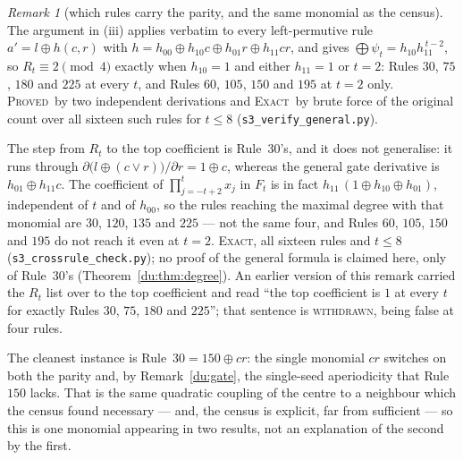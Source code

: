 \documentclass[11pt]{article}
\theoremstyle{definition}
\theoremstyle{remark}
\newtheorem{remark}[theorem]{Remark}
\newcommand{\PROVED}{\textsc{Proved}}
\newcommand{\EXACT}{\textsc{Exact}}
\begin{document}
\begin{remark}[which rules carry the parity, and the same monomial as the census]\label{du:degreerules}
The argument in (iii) applies verbatim to every left-permutive rule $a'=l\oplus h(c,r)$ with
$h=h_{00}\oplus h_{10}c\oplus h_{01}r\oplus h_{11}cr$, and gives $\bigoplus\psi_t=h_{10}h_{11}^{\,t-2}$,
so $R_t\equiv2\pmod4$ exactly when $h_{10}=1$ and either $h_{11}=1$ or $t=2$: Rules $30$, $75$, $180$
and $225$ at every $t$, and Rules $60$, $105$, $150$ and $195$ at $t=2$ only. \PROVED\ by two
independent derivations and \EXACT\ by brute force of the original count over all sixteen such rules
for $t\le8$ (\texttt{s3\_verify\_general.py}).

The step from $R_t$ to the top coefficient is Rule~$30$'s, and it does not generalise: it runs through
$\partial\bigl(l\oplus(c\vee r)\bigr)/\partial r=1\oplus c$, whereas the general gate derivative is
$h_{01}\oplus h_{11}c$. The coefficient of $\prod_{j=-t+2}^{t}x_j$ in $F_t$ is in fact
$h_{11}\,(1\oplus h_{10}\oplus h_{01})$, independent of $t$ and of $h_{00}$, so the rules reaching the
maximal degree with that monomial are $30$, $120$, $135$ and $225$ --- not the same four, and Rules
$60$, $105$, $150$ and $195$ do not reach it even at $t=2$. \EXACT, all sixteen rules and $t\le8$
(\texttt{s3\_crossrule\_check.py}); no proof of the general formula is claimed here, only of
Rule~$30$'s (Theorem~\ref{du:thm:degree}). An earlier version of this remark carried the $R_t$ list
over to the top coefficient and read ``the top coefficient is $1$ at every $t$ for exactly Rules $30$,
$75$, $180$ and $225$''; that sentence is \textsc{withdrawn}, being false at four rules.

The cleanest instance is Rule~$30=150\oplus cr$: the single monomial $cr$ switches on both
the parity and, by Remark~\ref{du:gate}, the single-seed aperiodicity that Rule~$150$ lacks. That is the
same quadratic coupling of the centre to a neighbour which the census found necessary --- and, the
census is explicit, far from sufficient --- so this is one monomial appearing in two results, not an
explanation of the second by the first.
\end{remark}
\end{document}

